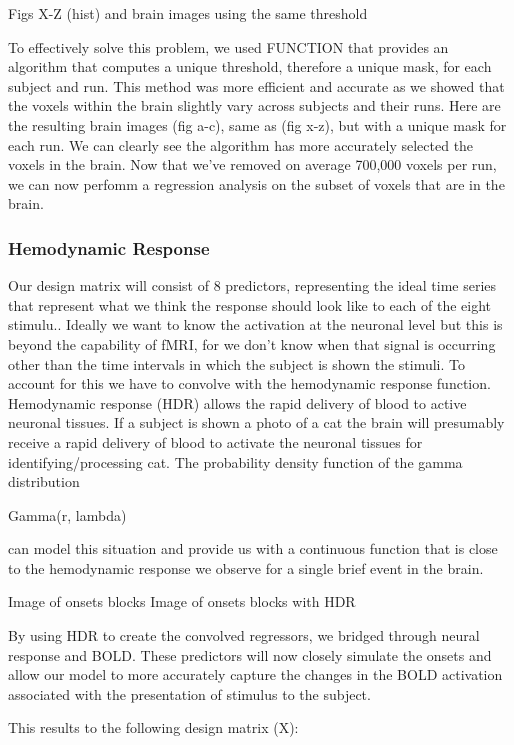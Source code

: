 \documentclass[11pt]{article}
\begin{document}
		Figs X-Z (hist) and brain images using the same threshold

To effectively solve this problem, we used FUNCTION that provides an algorithm 
that computes a unique threshold, therefore a unique mask, for each subject and 
run. This method was more efficient and accurate as we showed that the voxels 
within the brain slightly vary  across subjects and their runs. Here are the 
resulting brain images (fig a-c), same as (fig x-z), but with a unique mask for 
each run. We can clearly see the algorithm has  more accurately selected the 
voxels in the brain. Now that we've removed on average 700,000 voxels per run, 
we can now perfomm a regression analysis on the subset of voxels that are in 
the brain.    
          
\subsubsection{Hemodynamic Response}

Our design matrix will consist of 8 predictors, representing the ideal time series 
that represent what we think the response should look like to each of the eight 
stimulu.. Ideally we want to know the activation at the neuronal level but 
this is beyond the capability of fMRI, for we don’t know when that signal 
is occurring other than the time intervals in which the subject is shown the 
stimuli. To account for this we have to convolve with the hemodynamic response 
function. Hemodynamic response (HDR) allows the rapid delivery of blood to 
active neuronal tissues. If a subject is shown a photo of a cat the brain will 
presumably receive a rapid delivery of blood to activate the neuronal tissues 
for identifying/processing cat. The probability density function of the gamma 
distribution
	
	         Gamma(r, lambda)

can model this situation and provide us with a continuous function that is 
close to the hemodynamic response we observe for a single brief event in the 
brain.

		Image of onsets blocks
		Image of onsets blocks with HDR

By using HDR to create the convolved regressors, we bridged through neural 
response and BOLD. These predictors will now closely simulate the onsets and 
allow our model to more accurately capture the changes in the BOLD activation 
associated with the presentation of stimulus to the subject.

This results to the following design matrix (X):
\end{document}

